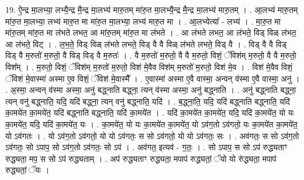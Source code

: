 \documentclass[17pt]{extarticle}
\begin{document}
19. ऐ॒न्द्र मा॒लभ्या॒ लभ्यै॒न्द्र मै॒न्द्र मा॒लभ्य॑ मारु॒तम् मा॑रु॒त मा॒लभ्यै॒न्द्र मै॒न्द्र मा॒लभ्य॑ मारु॒तम् । . आ॒लभ्य॑ मारु॒तम् मा॑रु॒त मा॒लभ्या॒ लभ्य॑ मारु॒त मा मा॑रु॒त मा॒लभ्या॒ लभ्य॑ मारु॒त मा । . आ॒लभ्येत्या᳚ - लभ्य॑ । . मा॒रु॒त मा मा॑रु॒तम् मा॑रु॒त मा ल॑भते लभत॒ आ मा॑रु॒तम् मा॑रु॒त मा ल॑भते । . आ ल॑भते लभत॒ आ ल॑भते॒ विड् विळ् ल॑भत॒ आ ल॑भते॒ विट् । . ल॒भ॒ते॒ विड् विळ् ल॑भते लभते॒ विड् वै वै विळ् ल॑भते लभते॒ विड् वै । . विड् वै वै विड् विड् वै म॒रुतो॑ म॒रुतो॒ वै विड् विड् वै म॒रुतः॑ । . वै म॒रुतो॑ म॒रुतो॒ वै वै म॒रुतो॒ विशं॒ ॅविश॑म् म॒रुतो॒ वै वै म॒रुतो॒ विश᳚म् । . म॒रुतो॒ विशं॒ ॅविश॑म् म॒रुतो॑ म॒रुतो॒ विश॑ मे॒वैव विश॑म् म॒रुतो॑ म॒रुतो॒ विश॑ मे॒व । . विश॑ मे॒वैव विशं॒ ॅविश॑ मे॒वास्मा॑ अस्मा ए॒व विशं॒ ॅविश॑ मे॒वास्मै᳚ । . ए॒वास्मा॑ अस्मा ए॒वै वास्मा॒ अन्वन् व॑स्मा ए॒वै वास्मा॒ अनु॑ । . अ॒स्मा॒ अन्वन् व॑स्मा अस्मा॒ अनु॑ बद्ध्नाति बद्ध्ना॒ त्यन् व॑स्मा अस्मा॒ अनु॑ बद्ध्नाति । . अनु॑ बद्ध्नाति बद्ध्ना॒ त्यन् वनु॑ बद्ध्नाति॒ यदि॒ यदि॑ बद्ध्ना॒ त्यन् वनु॑ बद्ध्नाति॒ यदि॑ । . ब॒द्ध्ना॒ति॒ यदि॒ यदि॑ बद्ध्नाति बद्ध्नाति॒ यदि॑ का॒मये॑त का॒मये॑त॒ यदि॑ बद्ध्नाति बद्ध्नाति॒ यदि॑ का॒मये॑त । . यदि॑ का॒मये॑त का॒मये॑त॒ यदि॒ यदि॑ का॒मये॑त॒ यो यः का॒मये॑त॒ यदि॒ यदि॑ का॒मये॑त॒ यः । . का॒मये॑त॒ यो यः का॒मये॑त का॒मये॑त॒ यो ऽव॑ग॒तो ऽव॑गतो॒ यः का॒मये॑त का॒मये॑त॒ यो ऽव॑गतः । . यो ऽव॑ग॒तो ऽव॑गतो॒ यो यो ऽव॑गतः॒ स सो ऽव॑गतो॒ यो यो ऽव॑गतः॒ सः । . अव॑गतः॒ स सो ऽव॑ग॒तो ऽव॑गतः॒ सो ऽपाप॒ सो ऽव॑ग॒तो ऽव॑गतः॒ सो ऽप॑ । . अव॑गत॒ इत्यव॑ - ग॒तः॒ । . सो ऽपाप॒ स सो ऽप॑ रुद्ध्यताꣳ रुद्ध्यता॒ मप॒ स सो ऽप॑ रुद्ध्यताम् । . अप॑ रुद्ध्यताꣳ रुद्ध्यता॒ मपाप॑ रुद्ध्यतां॒ ॅयो यो रु॑द्ध्यता॒ मपाप॑ रुद्ध्यतां॒ ॅयः । \newline
\end{document}
